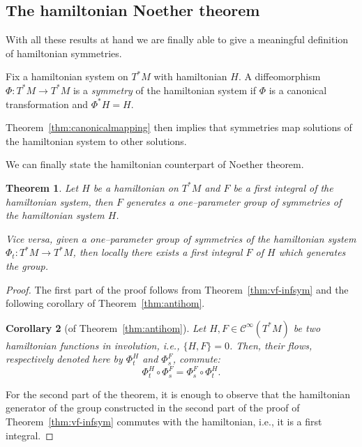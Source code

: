 \documentclass[english,fontsize=11pt,paper=a5,oneside]{scrbook}
\newcommand{\cC}{\mathcal{C}}
\newtheorem{theorem}{Theorem}[chapter]
\newtheorem{corollary}[theorem]{Corollary}
\theoremstyle{definition}
\begin{document}
\subsection{The hamiltonian Noether theorem}

With all these results at hand we are finally able to give a meaningful definition of hamiltonian symmetries.

\begin{tcolorbox}
  Fix a hamiltonian system on $T^*M$ with hamiltonian $H$. A diffeomorphism $\Phi:T^*M\to T^* M$ is a \emph{symmetry} of the hamiltonian system if $\Phi$ is a canonical transformation and $\Phi^* H = H$.
\end{tcolorbox}

Theorem~\ref{thm:canonicalmapping} then implies that symmetries map solutions of the hamiltonian system to other solutions.

We can finally state the hamiltonian counterpart of Noether theorem.

\begin{theorem}
  Let $H$ be a hamiltonian on $T^*M$ and $F$ be a first integral of the hamiltonian system, then $F$ generates a one--parameter group of symmetries of the hamiltonian system $H$.

  Vice versa, given a one--parameter group of symmetries of the hamiltonian system $\Phi_t:T^*M\to T^* M$, then \emph{locally} there exists a first integral $F$ of $H$ which generates the group.
\end{theorem}
\begin{proof}
  The first part of the proof follows from Theorem~\ref{thm:vf-infsym} and the following corollary of Theorem~\ref{thm:antihom}.

  \begin{corollary}[of Theorem~\ref{thm:antihom}]
    Let $H, F \in \cC^\infty(T^*M)$ be two hamiltonian functions in involution, i.e., $\{H,F\}=0$.
    Then, their flows, respectively denoted here by $\Phi_t^H$ and $\Phi_s^F$, commute:
    \begin{equation}
      \Phi_t^H \circ \Phi_s^F = \Phi_s^F \circ \Phi_t^H.
    \end{equation}
  \end{corollary}

  For the second part of the theorem, it is enough to observe that the hamiltonian generator of the group constructed in the second part of the proof of Theorem~\ref{thm:vf-infsym} commutes with the hamiltonian, i.e., it is a first integral.
\end{proof}
\end{document}
